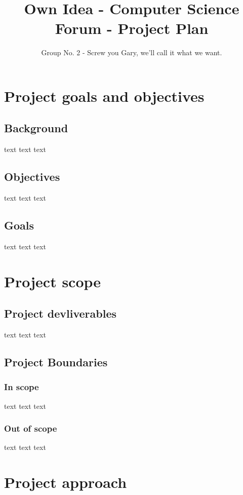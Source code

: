 \documentclass[a4paper, 12pt]{article}
\begin{document}
	\title{Own Idea - Computer Science Forum - Project Plan}
	\author{Group No. 2 - Screw you Gary, we'll call it what we want.}
	\maketitle
	\section{Project goals and objectives}
		\subsection{Background}
			\par text text text
		\subsection{Objectives}
			\par text text text

		\subsection{Goals}
			\par text text text

	\newpage		
	\section{Project scope}
		\subsection{Project devliverables}
			\par text text text
		\subsection{Project Boundaries}
			\subsubsection{In scope}
				\par text text text
			\subsubsection{Out of scope}
				\par text text text

	\newpage
	\section{Project approach}
\end{document}
